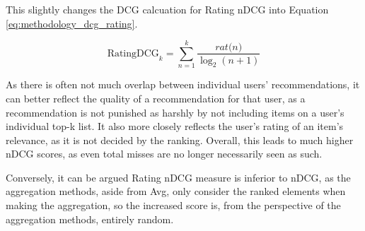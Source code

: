This slightly changes the DCG calcuation for Rating nDCG into Equation \ref{eq:methodology_dcg_rating}.

\begin{equation}\label{eq:methodology_dcg_rating}
\text{RatingDCG}_k = \sum_{n=1}^{k}\frac{\textit{rat(n)}}{\log_2(n + 1)}
\end{equation}

As there is often not much overlap between individual users' recommendations, it can better reflect the quality of a recommendation for that user, as a recommendation is not punished as harshly by not including items on a user's individual top-k list. It also more closely reflects the user's rating of an item's relevance, as it is not decided by the ranking. Overall, this leads to much higher nDCG scores, as even total misses are no longer necessarily seen as such.

Conversely, it can be argued Rating nDCG measure is inferior to nDCG, as the aggregation methods, aside from Avg, only consider the ranked elements when making the aggregation, so the increased score is, from the perspective of the aggregation methods, entirely random.